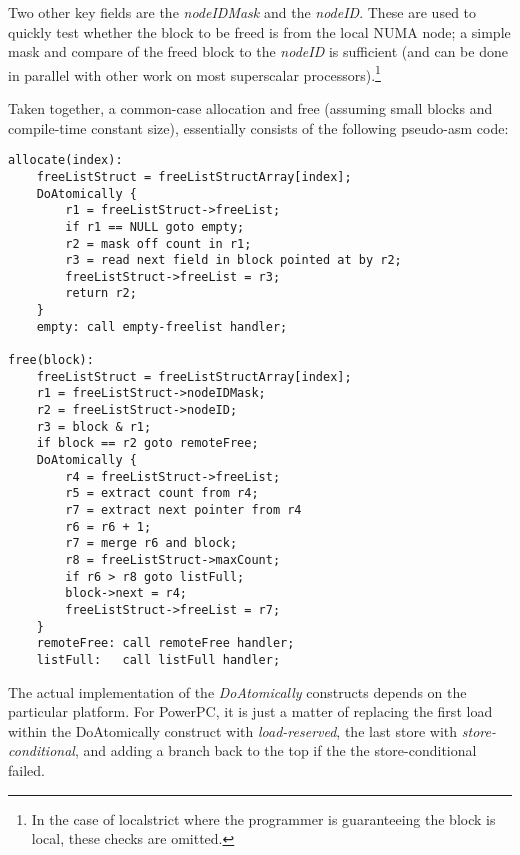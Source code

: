 \documentclass[dvips,11pt]{article}
\begin{document}
Two other key fields are the \emph{nodeIDMask} and the \emph{nodeID}.
These are used to quickly test whether the block to be freed is from the
local NUMA node; a simple mask and compare of the freed block to the
\emph{nodeID} is sufficient (and can be done in parallel with other work on
most superscalar processors).\footnote{In the case of localstrict where the 
  programmer is guaranteeing the block is local, these checks are omitted.}

Taken together, a common-case allocation and free (assuming small blocks
and compile-time constant size), essentially consists of the following
pseudo-asm code:

{\footnotesize
\begin{verbatim}
allocate(index):
    freeListStruct = freeListStructArray[index];
    DoAtomically {
        r1 = freeListStruct->freeList;
        if r1 == NULL goto empty;
        r2 = mask off count in r1;
        r3 = read next field in block pointed at by r2;
        freeListStruct->freeList = r3;
        return r2;
    }
    empty: call empty-freelist handler;

free(block):
    freeListStruct = freeListStructArray[index];
    r1 = freeListStruct->nodeIDMask;
    r2 = freeListStruct->nodeID;
    r3 = block & r1;
    if block == r2 goto remoteFree;
    DoAtomically {
        r4 = freeListStruct->freeList;
        r5 = extract count from r4;
        r7 = extract next pointer from r4    
        r6 = r6 + 1;
        r7 = merge r6 and block;
        r8 = freeListStruct->maxCount;
        if r6 > r8 goto listFull;
        block->next = r4;
        freeListStruct->freeList = r7;
    }
    remoteFree: call remoteFree handler;
    listFull:   call listFull handler;
\end{verbatim}
}
  
The actual implementation of the \emph{DoAtomically} constructs depends on
the particular platform.  For PowerPC, it is just a matter of replacing the
first load within the DoAtomically construct with \emph{load-reserved}, the
last store with \emph{store-conditional}, and adding a branch back to the
top if the the store-conditional failed.  
\end{document}
